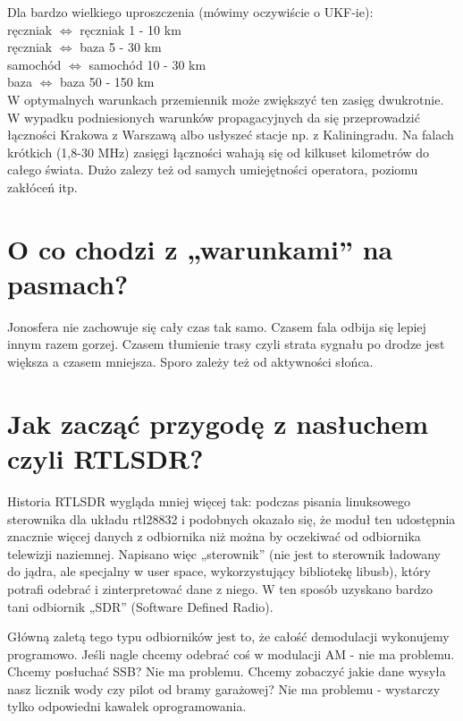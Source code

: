 \documentclass[a4paper,12pt]{article}
\begin{document}
Dla bardzo wielkiego uproszczenia (mówimy oczywiście o UKF-ie):\\
ręczniak $\Leftrightarrow$ ręczniak 1 - 10 km\\
ręczniak $\Leftrightarrow$ baza 5 - 30 km\\
samochód $\Leftrightarrow$ samochód 10 - 30 km\\
baza $\Leftrightarrow$ baza 50 - 150 km \\

W optymalnych warunkach przemiennik może zwiększyć ten zasięg dwukrotnie.
W wypadku podniesionych warunków propagacyjnych da się przeprowadzić łączności Krakowa z Warszawą albo usłyszeć stacje np. z Kaliningradu.
Na falach krótkich (1,8-30 MHz) zasięgi łączności wahają się od kilkuset kilometrów do całego świata. 
Dużo zalezy też od samych umiejętności operatora, poziomu zakłóceń itp. 

\section{O co chodzi z „warunkami” na pasmach?}
Jonosfera nie zachowuje się cały czas tak samo. Czasem fala odbija się lepiej innym razem gorzej. Czasem tłumienie trasy czyli strata sygnału po drodze jest większa a czasem mniejsza. 
Sporo zależy też od aktywności słońca.

\section{Jak zacząć przygodę z nasłuchem czyli RTLSDR?}
Historia RTLSDR wygląda mniej więcej tak: podczas pisania linuksowego sterownika dla układu rtl28832 i podobnych okazało się, że moduł ten udostępnia znacznie więcej danych z odbiornika niż można by oczekiwać od odbiornika telewizji naziemnej. Napisano więc „sterownik” (nie jest to sterownik ładowany do jądra, ale specjalny w user space, wykorzystujący bibliotekę libusb), który potrafi odebrać i zinterpretować dane z niego. W ten sposób uzyskano bardzo tani odbiornik „SDR” (Software Defined Radio).

Główną zaletą tego typu odbiorników jest to, że całość demodulacji wykonujemy programowo. Jeśli nagle chcemy odebrać coś w modulacji AM - nie ma problemu. Chcemy posłuchać SSB? Nie ma problemu. Chcemy zobaczyć jakie dane wysyła nasz licznik wody czy pilot od bramy garażowej? Nie ma problemu - wystarczy tylko odpowiedni kawałek oprogramowania.
\end{document}
